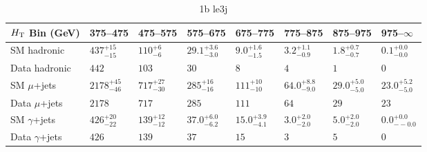 \documentclass[8pt]{article}
\def\scalht{\mbox{$H_{\rm{T}}$}\xspace}
\newcommand\T{\rule{0pt}{2.6ex}}
\newcommand\B{\rule[-1.2ex]{0pt}{0pt}}
\begin{document}
\begin{table}[ht!]
\caption{1b le3j}
\label{tab:ensemble-1b le3j}
\centering
\begin{tabular}{ llllllll }

\hline
\scalht Bin (GeV)       & 375--475                       & 475--575                       & 575--675                       & 675--775                       & 775--875                       & 875--975                       & 975--$\infty$                  \\ [1.000000ex]
\hline
SM hadronic\T           & $437^{+15}_{-15}$              & $110^{+6}_{-6}$                & $29.1^{+3.6}_{-3.0}$           & $9.0^{+1.6}_{-1.5}$            & $3.2^{+1.1}_{-0.9}$            & $1.8^{+0.7}_{-0.7}$            & $0.1^{+0.0}_{-0.0}$            \\ 
Data hadronic\B         & $442$                          & $103$                          & $30$                           & $8$                            & $4$                            & $1$                            & $0$                            \\ 
\hline
SM $\mu$+jets\T         & $2178^{+45}_{-46}$             & $717^{+27}_{-30}$              & $285^{+16}_{-16}$              & $111^{+10}_{-10}$              & $64.0^{+8.8}_{-9.0}$           & $29.0^{+5.0}_{-5.0}$           & $23.0^{+5.2}_{-5.0}$           \\ 
Data $\mu$+jets\B       & $2178$                         & $717$                          & $285$                          & $111$                          & $64$                           & $29$                           & $23$                           \\ 
\hline
SM $\gamma$+jets\T      & $426^{+20}_{-22}$              & $139^{+12}_{-12}$              & $37.0^{+6.0}_{-6.2}$           & $15.0^{+3.9}_{-4.1}$           & $3.0^{+2.0}_{-2.0}$            & $5.0^{+2.0}_{-2.0}$            & $0.0^{+0.0}_{--0.0}$           \\ 
Data $\gamma$+jets\B    & $426$                          & $139$                          & $37$                           & $15$                           & $3$                            & $5$                            & $0$                            \\ 
\hline

\end{tabular}
\end{table}
\end{document}
